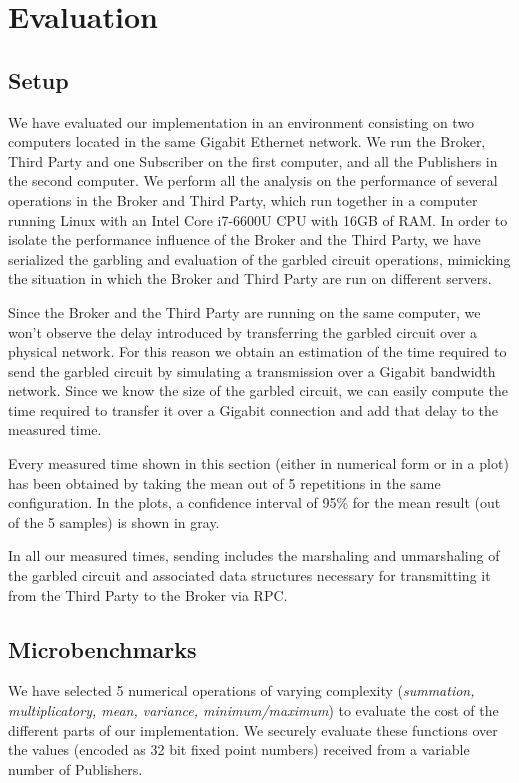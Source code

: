 \section{Evaluation}
\label{sec:evaluation}

\subsection{Setup}

We have evaluated our implementation in an environment consisting on two
computers located in the same Gigabit Ethernet network.  We run the Broker,
Third Party and one Subscriber on the first computer, and all the Publishers in
the second computer.  We perform all the analysis on the performance of several
operations in the Broker and Third Party, which run together in a computer
running Linux with an Intel Core i7-6600U CPU with 16GB of RAM.  In order to
isolate the performance influence of the Broker and the Third Party, we have
serialized the garbling and evaluation of the garbled circuit operations,
mimicking the situation in which the Broker and Third Party are run on
different servers.

Since the Broker and the Third Party are running on the same computer, we won't
observe the delay introduced by transferring the garbled circuit over a
physical network.  For this reason we obtain an estimation of the time required
to send the garbled circuit by simulating a transmission over a Gigabit
bandwidth network.  Since we know the size of the garbled circuit, we can
easily compute the time required to transfer it over a Gigabit connection and
add that delay to the measured time.

Every measured time shown in this section (either in numerical form or in a
plot) has been obtained by taking the mean out of 5 repetitions in the same
configuration.  In the plots, a confidence interval of 95\% for the mean result
(out of the 5 samples) is shown in gray.

In all our measured times, sending includes the marshaling and unmarshaling of
the garbled circuit and associated data structures necessary for transmitting
it from the Third Party to the Broker via RPC.

\subsection{Microbenchmarks}

We have selected 5 numerical operations of varying complexity (\emph{summation,
multiplicatory, mean, variance, minimum/maximum}) to evaluate the cost of the
different parts of our implementation.  We securely evaluate these functions
over the values (encoded as 32 bit fixed point numbers) received from a
variable number of Publishers.

